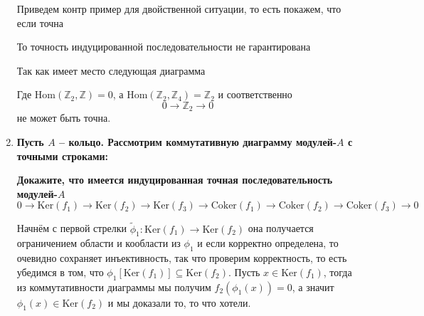 \documentclass{article}
\begin{document}
\begin{enumerate}
        Приведем контр пример для двойственной ситуации, то есть покажем, что если точна
        \begin{center}\end{center}
        То точность индуцированной последовательности не гарантирована
        \begin{center}\end{center}

        Так как имеет место следующая диаграмма
        \begin{center}\end{center}
        Где $\text{Hom}(\mathbb{Z}_2,\mathbb{Z})=0$, а $\text{Hom}(\mathbb{Z}_2,\mathbb{Z}_4)=\mathbb{Z}_2$
        и соответственно
        \[0\rightarrow\mathbb{Z}_2\rightarrow 0\]
        не может быть точна.

    \item \textbf{Пусть $A$ – кольцо. Рассмотрим коммутативную диаграмму модулей-$A$ с точными строками:}
        \begin{center}\end{center}
        \textbf{Докажите, что имеется индуцированная точная последовательность модулей-$A$}
        \[0\rightarrow\text{Ker}(f_1)\rightarrow\text{Ker}(f_2)\rightarrow\text{Ker}(f_3)\rightarrow
        \text{Coker}(f_1)\rightarrow\text{Coker}(f_2)\rightarrow\text{Coker}(f_3)\rightarrow 0\]

        Начнём с первой стрелки $\widetilde\phi_1:\text{Ker}(f_1)\rightarrow\text{Ker}(f_2)$
        она получается ограничением области и кообласти из $\phi_1$ и если корректно определена, 
        то очевидно сохраняет инъективность, так что проверим корректность, то есть убедимся в
        том, что $\phi_1[\text{Ker}(f_1)]\subseteq\text{Ker}(f_2)$. Пусть $x\in\text{Ker}(f_1)$,
        тогда из коммутативности диаграммы мы получим $f_2(\phi_1(x))=0$, а значит $\phi_1(x)\in\text{Ker}(f_2)$
        и мы доказали то, то что хотели.


\end{enumerate}
\end{document}
